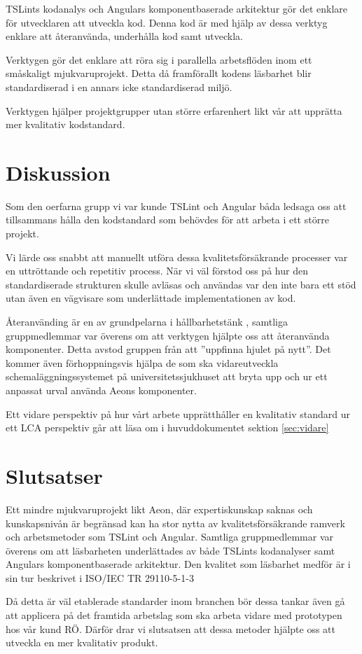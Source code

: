 TSLints kodanalys och Angulars komponentbaserade arkitektur gör det enklare för utvecklaren att utveckla kod. Denna kod är med hjälp av dessa verktyg enklare att återanvända, underhålla kod samt utveckla.

Verktygen gör det enklare att röra sig i parallella arbetsflöden inom ett småskaligt mjukvaruprojekt. Detta då framförallt kodens läsbarhet blir standardiserad i en annars icke standardiserad miljö.

Verktygen hjälper projektgrupper utan större erfarenhert likt vår att upprätta mer kvalitativ kodstandard.

\section{Diskussion}

Som den oerfarna  grupp vi var kunde TSLint och Angular båda ledsaga oss att tillsammans hålla den kodstandard som behövdes för att arbeta i ett större projekt.

Vi lärde oss snabbt att manuellt utföra dessa kvalitetsförsäkrande processer var en uttröttande och repetitiv process. När vi väl förstod oss på hur den standardiserade strukturen skulle avläsas och användas var den inte bara ett stöd utan även en vägvisare som underlättade implementationen av kod.

Återanvänding är en av grundpelarna i hållbarhetstänk \cite{sustainable}, samtliga gruppmedlemmar var överens om att verktygen hjälpte oss att återanvända komponenter. Detta avstod gruppen från att ''uppfinna hjulet på nytt''. Det kommer även förhoppningsvis hjälpa de som ska vidareutveckla schemaläggningssystemet på universitetssjukhuset att bryta upp och ur ett anpassat urval använda Aeons komponenter.

Ett vidare perspektiv på hur vårt arbete upprätthåller en kvalitativ standard ur ett LCA perspektiv går att läsa om i huvuddokumentet sektion \ref{sec:vidare}

\section{Slutsatser}

Ett mindre mjukvaruprojekt likt Aeon, där expertiskunskap saknas och kunskapsnivån är begränsad kan ha stor nytta av kvalitetsförsäkrande ramverk och arbetsmetoder som TSLint och Angular. 
Samtliga gruppmedlemmar var överens om att läsbarheten underlättades av både TSLints kodanalyser samt Angulars komponentbaserade arkitektur.
Den kvalitet som läsbarhet medför är i sin tur beskrivet i ISO/IEC TR 29110-5-1-3

Då detta är väl etablerade standarder inom branchen bör dessa tankar även gå att applicera på det framtida arbetslag som ska arbeta vidare med prototypen hos vår kund RÖ. Därför drar vi slutsatsen att dessa metoder hjälpte oss att utveckla en mer kvalitativ produkt.


